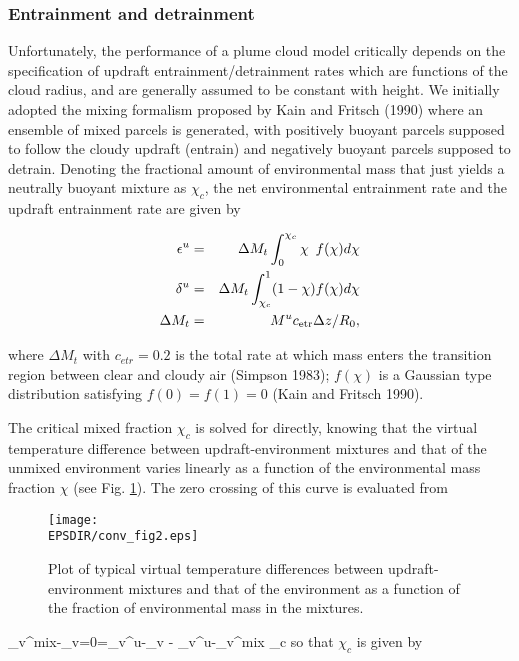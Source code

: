 \subsubsection {Entrainment and detrainment}

Unfortunately, the performance of a plume cloud model critically depends on
the specification of updraft entrainment/detrainment rates which are
functions of the cloud radius, and are generally
assumed to be constant with height. We initially adopted the
mixing formalism proposed by Kain and Fritsch (1990) where an
ensemble of mixed parcels is generated, with
positively buoyant parcels supposed to follow the cloudy updraft (entrain)
and negatively buoyant parcels supposed to detrain.
Denoting the fractional amount of environmental mass
that just yields a neutrally buoyant mixture  as $\chi_c$, the
net environmental entrainment rate and the updraft entrainment rate
are given by


\begin{eqnarray}
\epsilon^u&=&\Delta M_t\int_0^{\chi_c} \chi\,\,\, f(\chi) d\chi
\label{eqentr}\\
\delta^u&=&\Delta M_t\int^1_{\chi_c} (1-\chi) f(\chi) d\chi
\label{eqdetr}\\
\Delta M_t&=&M^u c_{\rm etr}\Delta z/R_0,
\label{eqMt}
\end{eqnarray}

\noindent
where $\Delta M_t$ with $c_{etr}=0.2$
is the total rate at which mass enters the transition
region between clear and cloudy air (Simpson 1983); $f(\chi)$ is a
Gaussian type distribution satisfying $f(0)=f(1)=0$ (Kain and Fritsch 1990).


The critical mixed fraction $\chi_c$
is solved for directly, knowing that the virtual temperature difference between
updraft-environment mixtures and that of the unmixed environment varies
linearly as a function of the environmental mass fraction $\chi$
(see Fig. \ref{conv_fig2}). The zero crossing of this curve is evaluated from

\begin{figure}
\centerline{\texttt{[image: \\EPSDIR/conv\_fig2.eps]}}
\caption{Plot of typical virtual temperature differences between
updraft-environment mixtures and that of the environment as a
function of the fraction of environmental mass in the mixtures.}
\label{conv_fig2}
\end{figure}

\beq
\theta_v^{mix}-\overline{\theta}_v=0=\theta_v^u-\overline{\theta}_v
- {\theta_v^u-\theta_v^{mix}\over\chi} \chi_c
\eeq
\noindent so that $\chi_c$ is given by

